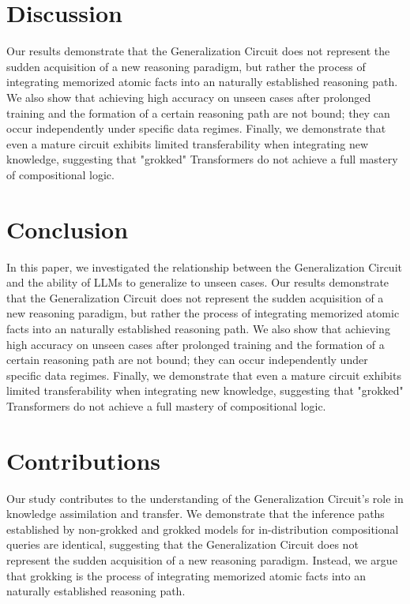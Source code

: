 \documentclass{article}
\begin{document}
\section{Discussion}
Our results demonstrate that the Generalization Circuit does not represent the sudden acquisition of a new reasoning paradigm, but rather the process of integrating memorized atomic facts into an naturally established reasoning path. We also show that achieving high accuracy on unseen cases after prolonged training and the formation of a certain reasoning path are not bound; they can occur independently under specific data regimes. Finally, we demonstrate that even a mature circuit exhibits limited transferability when integrating new knowledge, suggesting that "grokked" Transformers do not achieve a full mastery of compositional logic.

\section{Conclusion}
In this paper, we investigated the relationship between the Generalization Circuit and the ability of LLMs to generalize to unseen cases. Our results demonstrate that the Generalization Circuit does not represent the sudden acquisition of a new reasoning paradigm, but rather the process of integrating memorized atomic facts into an naturally established reasoning path. We also show that achieving high accuracy on unseen cases after prolonged training and the formation of a certain reasoning path are not bound; they can occur independently under specific data regimes. Finally, we demonstrate that even a mature circuit exhibits limited transferability when integrating new knowledge, suggesting that "grokked" Transformers do not achieve a full mastery of compositional logic.

\section{Contributions}
Our study contributes to the understanding of the Generalization Circuit's role in knowledge assimilation and transfer. We demonstrate that the inference paths established by non-grokked and grokked models for in-distribution compositional queries are identical, suggesting that the Generalization Circuit does not represent the sudden acquisition of a new reasoning paradigm. Instead, we argue that grokking is the process of integrating memorized atomic facts into an naturally established reasoning path.
\end{document}

